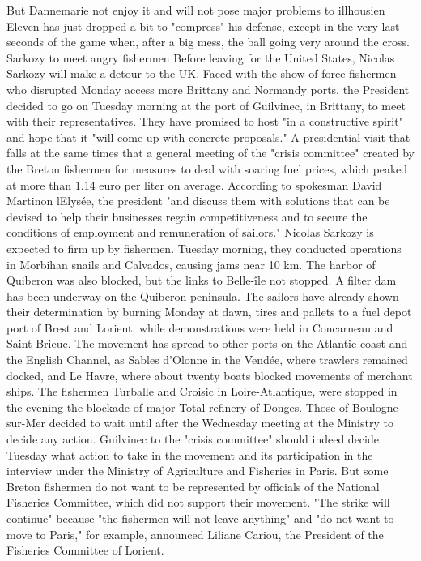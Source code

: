 But Dannemarie not enjoy it and will not pose major problems to illhousien Eleven has just dropped a bit to "compress" his defense, except in the very last seconds of the game when, after a big mess, the ball going very around the cross.
Sarkozy to meet angry fishermen
Before leaving for the United States, Nicolas Sarkozy will make a detour to the UK.
Faced with the show of force fishermen who disrupted Monday access more Brittany and Normandy ports, the President decided to go on Tuesday morning at the port of Guilvinec, in Brittany, to meet with their representatives.
They have promised to host "in a constructive spirit" and hope that it "will come up with concrete proposals."
A presidential visit that falls at the same times that a general meeting of the "crisis committee" created by the Breton fishermen for measures to deal with soaring fuel prices, which peaked at more than 1.14 euro per liter on average.
According to spokesman David Martinon lElysée, the president "and discuss them with solutions that can be devised to help their businesses regain competitiveness and to secure the conditions of employment and remuneration of sailors."
Nicolas Sarkozy is expected to firm up by fishermen.
Tuesday morning, they conducted operations in Morbihan snails and Calvados, causing jams near 10 km.
The harbor of Quiberon was also blocked, but the links to Belle-île not stopped.
A filter dam has been underway on the Quiberon peninsula.
The sailors have already shown their determination by burning Monday at dawn, tires and pallets to a fuel depot port of Brest and Lorient, while demonstrations were held in Concarneau and Saint-Brieuc.
The movement has spread to other ports on the Atlantic coast and the English Channel, as Sables d'Olonne in the Vendée, where trawlers remained docked, and Le Havre, where about twenty boats blocked movements of merchant ships.
The fishermen Turballe and Croisic in Loire-Atlantique, were stopped in the evening the blockade of major Total refinery of Donges.
Those of Boulogne-sur-Mer decided to wait until after the Wednesday meeting at the Ministry to decide any action.
Guilvinec to the "crisis committee" should indeed decide Tuesday what action to take in the movement and its participation in the interview under the Ministry of Agriculture and Fisheries in Paris.
But some Breton fishermen do not want to be represented by officials of the National Fisheries Committee, which did not support their movement.
"The strike will continue" because "the fishermen will not leave anything" and "do not want to move to Paris," for example, announced Liliane Cariou, the President of the Fisheries Committee of Lorient.
